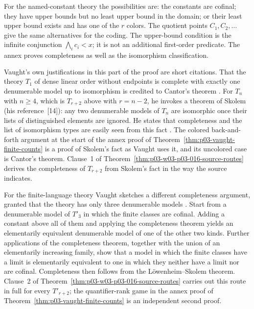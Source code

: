 For the named-constant theory the possibilities are: the constants are
cofinal; they have upper bounds but no least upper bound in the domain; or
their least upper bound exists and has one of the \(r\) colors. The quotient
points \(C_1,C_2,\ldots\) give the same alternatives for the coding.
The upper-bound condition is the infinite conjunction
\(\bigwedge_i c_i<x\); it is not an additional first-order predicate.
The annex proves completeness as well as the isomorphism classification.

Vaught's own justifications in this part of the proof are short citations.
That the theory \(T_1\) of dense linear order without endpoints is complete
with exactly one denumerable model up to isomorphism is credited to Cantor's
theorem \cite[p.~318]{Vaught1961}. For \(T_n\) with \(n\ge4\), which is
\(T_{r+2}\) above with \(r=n-2\), he invokes a theorem of
Skolem (his reference~[14]): any two denumerable models of \(T_n\) are
isomorphic once their lists of distinguished elements are ignored. He states
that completeness and the list of isomorphism types are easily seen from this
fact \cite[p.~319]{Vaught1961}. The colored back-and-forth argument at the
start of the annex proof of Theorem~\ref{thm:p03-vaught-finite-counts} is a
proof of Skolem's fact as Vaught uses it, and its uncolored case is Cantor's
theorem. Clause~1 of Theorem~\ref{thm:p03-w03-p03-016-source-routes}
derives the completeness of \(T_{r+2}\) from Skolem's fact in the way the
source indicates.

For the finite-language theory Vaught sketches a different completeness
argument, granted that the theory has only three denumerable models
\cite[pp.~319--320]{Vaught1961}. Start from a denumerable model of \(T'_3\)
in which the finite classes are cofinal. Adding a constant above all of
them and applying the completeness theorem yields an elementarily equivalent
denumerable model of one of the other two kinds. Further applications of the
completeness theorem, together with the union of an elementarily increasing
family, show that a model in which the finite classes have a limit is
elementarily equivalent to one in which they neither have a limit nor are
cofinal. Completeness then follows from the L\"owenheim--Skolem theorem.
Clause~2 of Theorem~\ref{thm:p03-w03-p03-016-source-routes} carries out this
route in full for every \(T'_{r+2}\); the quantifier-rank game in the annex
proof of Theorem~\ref{thm:p03-vaught-finite-counts} is an independent second
proof.

